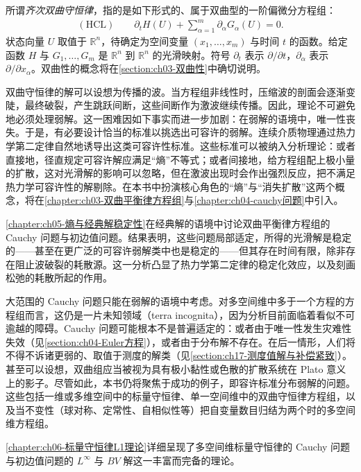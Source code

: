\documentclass[../../main.tex]{subfiles}
\begin{document}
\begin{definition*}[齐次双曲守恒律]
所谓\emph{齐次双曲守恒律}，指的是如下形式的、属于双曲型的一阶偏微分方程组：
\begin{align*}
(\mathrm{HCL})\qquad \partial_t H(U)+\sum_{\alpha=1}^{m}\partial_\alpha G_\alpha(U)=0.
\end{align*}
状态向量 $U$ 取值于 $\mathbb{R}^{n}$，待确定为空间变量 $(x_1,\ldots,x_m)$ 与时间 $t$ 的函数。给定函数 $H$ 与 $G_1,\ldots,G_m$ 是 $\mathbb{R}^{n}$ 到 $\mathbb{R}^{n}$ 的光滑映射。符号 $\partial_t$ 表示 $\partial/\partial t$，$\partial_\alpha$ 表示 $\partial/\partial x_\alpha$。双曲性的概念将在\cref{section:ch03-双曲性}中确切说明。
\end{definition*}

双曲守恒律的解可以设想为传播的波。当方程组非线性时，压缩波的剖面会逐渐变陡，最终破裂，产生跳跃间断，这些间断作为激波继续传播。因此，理论不可避免地必须处理弱解。这一困难因如下事实而进一步加剧：在弱解的语境中，唯一性丧失。于是，有必要设计恰当的标准以挑选出可容许的弱解。连续介质物理通过热力学第二定律自然地诱导出这类可容许性标准。这些标准可以被纳入分析理论：或者直接地，径直规定可容许解应满足“熵”不等式；或者间接地，给方程组配上极小量的扩散，这对光滑解的影响可以忽略，但在激波出现时会作出强烈反应，把不满足热力学可容许性的解剔除。在本书中扮演核心角色的“熵”与“消失扩散”这两个概念，将在\cref{chapter:ch03-双曲平衡律方程组}与\cref{chapter:ch04-cauchy问题}中引入。

\cref{chapter:ch05-熵与经典解稳定性}在经典解的语境中讨论双曲平衡律方程组的 Cauchy 问题与初边值问题。结果表明，这些问题局部适定，所得的光滑解是稳定的——甚至在更广泛的可容许弱解类中也是稳定的——但其存在时间有限，除非存在阻止波破裂的耗散源。这一分析凸显了热力学第二定律的稳定化效应，以及刻画松弛的耗散所起的作用。

大范围的 Cauchy 问题只能在弱解的语境中考虑。对多空间维中多于一个方程的方程组而言，这仍是一片未知领域（terra incognita），因为分析目前面临着看似不可逾越的障碍。Cauchy 问题可能根本不是普遍适定的：或者由于唯一性发生灾难性失效（见\cref{section:ch04-Euler方程}），或者由于分布解不存在。在后一情形，人们将不得不诉诸更弱的、取值于测度的解类（见\cref{section:ch17-测度值解与补偿紧致}）。甚至可以设想，双曲组应当被视为具有极小黏性或色散的扩散系统在 Plato 意义上的影子。尽管如此，本书仍将聚焦于成功的例子，即容许标准分布弱解的问题。这些包括一维或多维空间中的标量守恒律、单一空间维中的双曲守恒律方程组，以及当不变性（球对称、定常性、自相似性等）把自变量数目归结为两个时的多空间维方程组。

\cref{chapter:ch06-标量守恒律L1理论}详细呈现了多空间维标量守恒律的 Cauchy 问题与初边值问题的 $L^{\infty}$ 与 $BV$ 解这一丰富而完备的理论。
\end{document}
